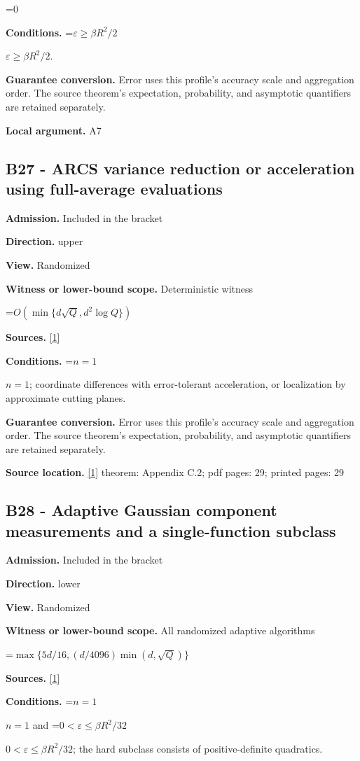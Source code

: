 \documentclass[10pt,a4paper]{article}
\newcommand{\AtlasMath}[1]{\par\begingroup\centering\setbox0=\hbox{$\displaystyle #1$}\ifdim\wd0>1.4\linewidth\typeout{ATLAS WIDE FORMULA: \the\wd0}\fi\ifdim\wd0>\linewidth\resizebox{\linewidth}{!}{\box0}\else\box0\fi\par\endgroup}
\newcommand{\AtlasInlineMath}[1]{\begingroup\setbox0=\hbox{$#1$}\ifdim\wd0>.4\linewidth\endgroup\AtlasMath{#1}\else\endgroup$#1$\fi}
\begin{document}
\AtlasMath{0}
\textbf{Conditions.} \AtlasInlineMath{\varepsilon\ge\beta R^2/2}.

\textbf{Guarantee conversion.} Error uses this profile's accuracy scale and aggregation order. The source theorem's expectation, probability, and asymptotic quantifiers are retained separately.

\textbf{Local argument.} A7

\subsection{B27 - ARCS variance reduction or acceleration using full-average evaluations}
\textbf{Admission.} Included in the bracket

\textbf{Direction.} upper

\textbf{View.} Randomized

\textbf{Witness or lower-bound scope.} Deterministic witness

\AtlasMath{O\!\left(\min\{d\sqrt Q,d^2\log Q\}\right)}
\textbf{Sources.} \href{https://arxiv.org/html/2610.00345v1}{[1]}

\textbf{Conditions.} \AtlasInlineMath{n=1}; coordinate differences with error-tolerant acceleration, or localization by approximate cutting planes.

\textbf{Guarantee conversion.} Error uses this profile's accuracy scale and aggregation order. The source theorem's expectation, probability, and asymptotic quantifiers are retained separately.

\textbf{Source location.} \href{https://arxiv.org/html/2610.00345v1}{[1]} theorem: Appendix C.2; pdf pages: 29; printed pages: 29

\subsection{B28 - Adaptive Gaussian component measurements and a single-function subclass}
\textbf{Admission.} Included in the bracket

\textbf{Direction.} lower

\textbf{View.} Randomized

\textbf{Witness or lower-bound scope.} All randomized adaptive algorithms

\AtlasMath{\max\{5d/16,(d/4096)\min(d,\sqrt Q)\}}
\textbf{Sources.} \href{https://arxiv.org/html/2610.00345v1}{[1]}

\textbf{Conditions.} \AtlasInlineMath{n=1} and \AtlasInlineMath{0<\varepsilon\le\beta R^2/32}; the hard subclass consists of positive-definite quadratics.
\end{document}
